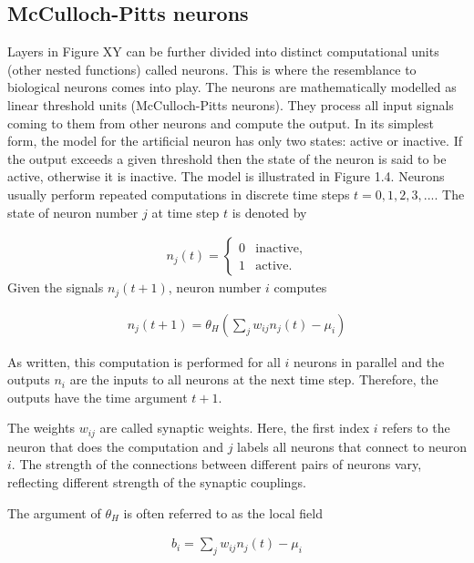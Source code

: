\subsection{McCulloch-Pitts neurons}

Layers in Figure XY can be further divided into distinct computational units (other nested functions) called neurons. This is where the resemblance to biological neurons comes into play. The neurons are mathematically modelled as linear threshold units (McCulloch-Pitts neurons). They process all input signals coming to them from other neurons and compute the output. In its simplest form, the model for the artificial neuron has only two states: active or inactive. If the output exceeds a given threshold then the state of the neuron is said to be active, otherwise it is inactive. The model is illustrated in Figure 1.4. Neurons usually perform repeated computations in discrete time steps $ t = 0,1,2,3,.... $ The state of neuron number $ j $ at time step $ t $ is denoted by

\begin{gather}
n_j(t) = 
	\begin{cases}	
		0 & \text{inactive,}\\
		1 & \text{active.}
	\end{cases} 
\end{gather}
\noindent Given the signals $ n_j(t+1) $, neuron number $ i $ computes

\begin{gather}
n_j(t+1)=\theta_H \left(\sum\limits_{j}w_{ij}n_j(t) - \mu_i \right)
\end{gather}

As written, this computation is performed for all $ i $ neurons in parallel and the outputs $ n_i $ are the inputs to all neurons at the next time step. Therefore, the outputs have the time argument $ t+1 $.

The weights $ w_{ij} $ are called synaptic weights. Here, the first index $ i $
refers to the neuron that does the computation and $ j $ labels all neurons that connect
to neuron $ i $. The strength of the connections between different pairs of neurons vary, reflecting different strength of the synaptic couplings.

The argument of $ \theta_H $ is often referred to as the local field

\begin{gather}
b_i = \sum\limits_{j}w_{ij}n_j(t) - \mu_i
\end{gather}

